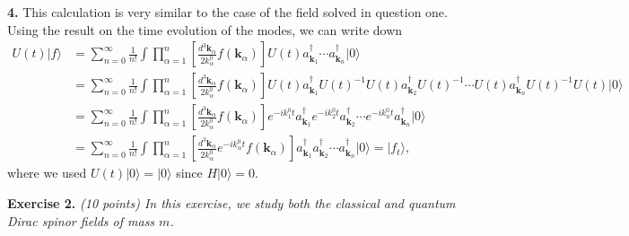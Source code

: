 \textbf{4.} This calculation is very similar to the case of the field solved in question one. Using the result on the time evolution of the modes, we can write down
\begin{equation}
\begin{aligned}
    U(t) |f\rangle &= \sum_{n=0}^\infty \frac{1}{n!} \int \prod_{\alpha=1}^n \left[ \frac{d^3\mathbf{k}_\alpha}{2k^0_\alpha} f(\mathbf{k}_\alpha) \right] U(t) a^\dagger_{\mathbf{k}_1} \cdots a^\dagger_{\mathbf{k}_n} |0\rangle \\
    &= \sum_{n=0}^\infty \frac{1}{n!} \int \prod_{\alpha=1}^n \left[ \frac{d^3\mathbf{k}_\alpha}{2k^0_\alpha} f(\mathbf{k}_\alpha) \right] U(t) a^\dagger_{\mathbf{k}_1} U(t)^{-1} U(t) a^\dagger_{\mathbf{k}_2} U(t)^{-1} \cdots U(t) a^\dagger_{\mathbf{k}_n} U(t)^{-1} U(t) |0\rangle \\
    &= \sum_{n=0}^\infty \frac{1}{n!} \int \prod_{\alpha=1}^n \left[ \frac{d^3\mathbf{k}_\alpha}{2k^0_\alpha} f(\mathbf{k}_\alpha) \right] e^{-ik^0_1 t} a^\dagger_{\mathbf{k}_1} e^{-ik^0_2 t} a^\dagger_{\mathbf{k}_2} \cdots e^{-ik^0_n t} a^\dagger_{\mathbf{k}_n} |0\rangle \\
    &= \sum_{n=0}^\infty \frac{1}{n!} \int \prod_{\alpha=1}^n \left[ \frac{d^3\mathbf{k}_\alpha}{2k^0_\alpha} e^{-ik^0_\alpha t} f(\mathbf{k}_\alpha) \right] a^\dagger_{\mathbf{k}_1} a^\dagger_{\mathbf{k}_2} \cdots a^\dagger_{\mathbf{k}_n} |0\rangle = |f_t\rangle,
\end{aligned}
\end{equation}
where we used $U(t)|0\rangle = |0\rangle$ since $H|0\rangle = 0$.

\textbf{Exercise 2.} \textit{(10 points) In this exercise, we study both the classical and quantum Dirac spinor fields of mass $m$.}

